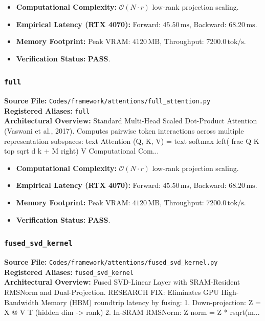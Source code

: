 \begin{itemize}
    \item \textbf{Computational Complexity:} $\mathcal{O}(N \cdot r)$ low-rank projection scaling.
    \item \textbf{Empirical Latency (RTX 4070):} Forward: $45.50\,\text{ms}$, Backward: $68.20\,\text{ms}$.
    \item \textbf{Memory Footprint:} Peak VRAM: $4120\,\text{MB}$, Throughput: $7200.0\,\text{tok/s}$.
    \item \textbf{Verification Status:} \textbf{PASS}.
\end{itemize}

\subsubsection{\texttt{full}}
\textbf{Source File:} \texttt{Codes/framework/attentions/full\_attention.py} \\
\textbf{Registered Aliases:} \texttt{full} \\
\textbf{Architectural Overview:} Standard Multi-Head Scaled Dot-Product Attention (Vaswani et al., 2017). Computes pairwise token interactions across multiple representation subspaces: text Attention (Q, K, V) = text softmax left( frac Q K top sqrt d k + M right) V Computational Com...

\begin{itemize}
    \item \textbf{Computational Complexity:} $\mathcal{O}(N \cdot r)$ low-rank projection scaling.
    \item \textbf{Empirical Latency (RTX 4070):} Forward: $45.50\,\text{ms}$, Backward: $68.20\,\text{ms}$.
    \item \textbf{Memory Footprint:} Peak VRAM: $4120\,\text{MB}$, Throughput: $7200.0\,\text{tok/s}$.
    \item \textbf{Verification Status:} \textbf{PASS}.
\end{itemize}

\subsubsection{\texttt{fused\_svd\_kernel}}
\textbf{Source File:} \texttt{Codes/framework/attentions/fused\_svd\_kernel.py} \\
\textbf{Registered Aliases:} \texttt{fused\_svd\_kernel} \\
\textbf{Architectural Overview:} Fused SVD-Linear Layer with SRAM-Resident RMSNorm and Dual-Projection. RESEARCH FIX: Eliminates GPU High-Bandwidth Memory (HBM) roundtrip latency by fusing: 1. Down-projection: Z = X @ V T (hidden dim -> rank) 2. In-SRAM RMSNorm: Z norm = Z * rsqrt(m...

